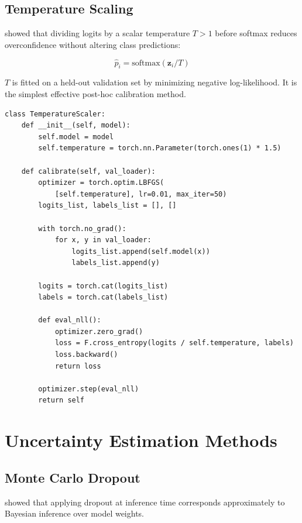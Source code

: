 \subsection{Temperature Scaling}

\textcite{guo2017calibration} showed that dividing logits by a scalar temperature $T > 1$ before softmax reduces overconfidence without altering class predictions:

\[
\hat{p}_i = \text{softmax}(\mathbf{z}_i / T)
\]

$T$ is fitted on a held-out validation set by minimizing negative log-likelihood. It is the simplest effective post-hoc calibration method.

\begin{lstlisting}[style=python, caption={Temperature scaling implementation}]
class TemperatureScaler:
    def __init__(self, model):
        self.model = model
        self.temperature = torch.nn.Parameter(torch.ones(1) * 1.5)

    def calibrate(self, val_loader):
        optimizer = torch.optim.LBFGS(
            [self.temperature], lr=0.01, max_iter=50)
        logits_list, labels_list = [], []

        with torch.no_grad():
            for x, y in val_loader:
                logits_list.append(self.model(x))
                labels_list.append(y)

        logits = torch.cat(logits_list)
        labels = torch.cat(labels_list)

        def eval_nll():
            optimizer.zero_grad()
            loss = F.cross_entropy(logits / self.temperature, labels)
            loss.backward()
            return loss

        optimizer.step(eval_nll)
        return self
\end{lstlisting}

\section{Uncertainty Estimation Methods}

\subsection{Monte Carlo Dropout}

\textcite{gal2016dropout} showed that applying dropout at inference time corresponds approximately to Bayesian inference over model weights.

